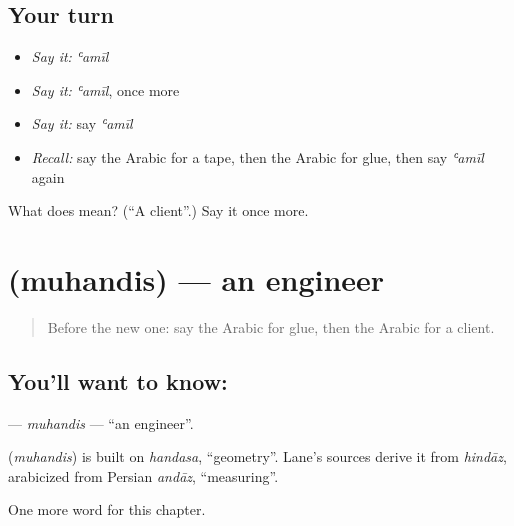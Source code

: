 \subsection*{Your turn}
\begin{itemize}
\raggedright
  \item \emph{Say it:} \emph{ʿamīl}
  \item \emph{Say it:} \emph{ʿamīl}, once more
  \item \emph{Say it:} say \emph{ʿamīl}
  \item \emph{Recall:} say the Arabic for a tape, then the Arabic for glue, then say \emph{ʿamīl} again
\end{itemize}

\begin{tcolorbox}[breakable,colback=teal!4,colframe=teal!35!black,title={Before you move on}]
What does  mean? (\textquotedblleft{}A client\textquotedblright{}.) Say it once more.
\end{tcolorbox}
\section[\texorpdfstring{\ar{مهندس} (muhandis)}{مهندس (muhandis)}]{ (muhandis) — an engineer}

\label{lesson:AR-C280-muhandis}



\begin{quote}
Before the new one: say the Arabic for glue, then the Arabic for a client.
\end{quote}

\subsection*{You'll want to know: }
\textbf{} — \emph{muhandis} — \textquotedblleft{}an engineer\textquotedblright{}.

\begin{cousinweb}
\textbf{} (\emph{muhandis}) is built on \emph{handasa}, \textquotedblleft{}geometry\textquotedblright{}. Lane's sources derive it from \emph{hindāz}, arabicized from Persian \emph{andāz}, \textquotedblleft{}measuring\textquotedblright{}.
\end{cousinweb}

\begin{grammarlens}[title={What you've built}]
One more word for this chapter.
\end{grammarlens}

